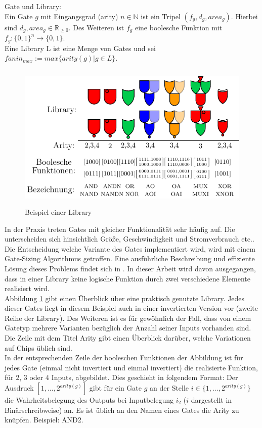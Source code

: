 \documentclass[11pt, a4paper, german]{article}
\begin{document}
\begin{definition}{Gate und Library:}\label{def:gate}\\
Ein Gate $g$ mit Eingangsgrad (arity) $ n \in \mathbb{N}$ ist ein Tripel $(f_g, d_g, area_g)$. Hierbei sind $d_g, area_g \in \mathbb{R}_{\geq 0}$. Des Weiteren ist $f_g$ eine boolesche Funktion mit $ f_g : \{0,1\}^n \rightarrow \{0, 1\} $. \\
Eine Library L ist eine Menge von Gates und sei \\ 
$fanin_{max} := max\{ arity(g) | g \in L \}$.
\end{definition}
\begin{figure}[h]
\begin{center}
 \includegraphics[height = 200pt]{./pictures/compiled/new_library}
 \caption{Beispiel einer Library}
 \label{bild:new_library}
\end{center}
\end{figure}
In der Praxis treten Gates mit gleicher Funktionalit\"at sehr h\"aufig auf. Die unterscheiden sich hinsichtlich Gr\"o{\ss}e, Geschwindigkeit und Stromverbrauch etc.. Die Entscheidung welche Variante des Gates implementiert wird, wird mit einem Gate-Sizing Algorithmus getroffen. Eine ausf\"uhrliche Beschreibung und effiziente L\"osung dieses Problems findet sich in \cite{GateSizing}. In dieser Arbeit wird davon ausgegangen, dass in einer Library keine logische Funktion durch zwei verschiedene Elemente realisiert wird.\\
Abbildung \ref{bild:new_library} gibt einen Überblick über eine praktisch genutzte Library. Jedes dieser Gates liegt in diesem Beispiel auch in einer invertierten Version vor (zweite Reihe der Library). Des Weiteren ist es für gewöhnlich der Fall, dass von einem Gatetyp mehrere Varianten bezüglich der Anzahl seiner Inputs vorhanden sind. Die Zeile mit dem Titel Arity gibt einen Überblick darüber, welche Variationen auf Chips üblich sind.\\
In der entsprechenden Zeile der booleschen Funktionen der Abbildung ist für jedes Gate (einmal nicht invertiert und einmal invertiert) die realisierte  Funktion, für 2, 3 oder 4 Inputs, abgebildet. Dies geschieht in folgendem Format: Der Ausdruck $[1,...,2^{arity(g)} ]$ gibt für ein Gate $g$ an der Stelle $i \in \{1,...,2^{arity(g)}\}$ die Wahrheitsbelegung des Outputs bei Inputbelegung $i_2$ ($i$ dargestellt in Binärschreibweise) an. Es ist üblich an den Namen eines Gates die Arity zu knüpfen. Beispiel: AND2. \\
\end{document}
